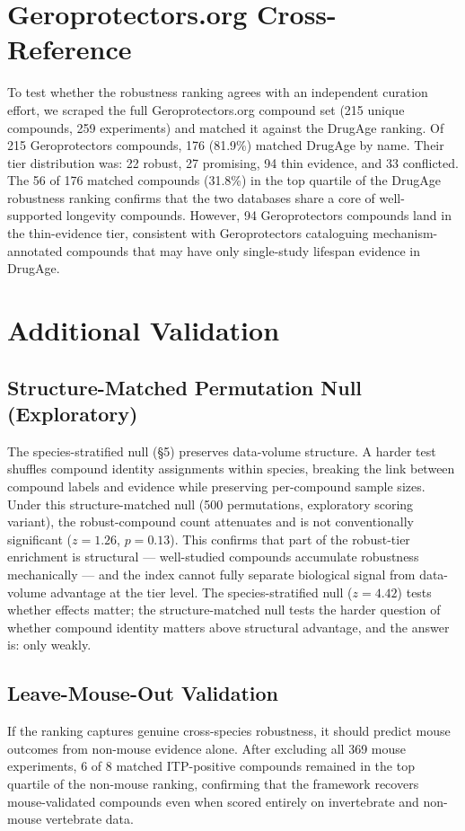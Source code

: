 \documentclass[11pt]{article}
\begin{document}
\section{Geroprotectors.org Cross-Reference}
\label{sec:gero}
To test whether the robustness ranking agrees with an independent curation effort, we scraped the full Geroprotectors.org compound set (215 unique compounds, 259 experiments) and matched it against the DrugAge ranking. Of 215 Geroprotectors compounds, 176 (81.9\%) matched DrugAge by name. Their tier distribution was: 22 robust, 27 promising, 94 thin evidence, and 33 conflicted. The 56 of 176 matched compounds (31.8\%) in the top quartile of the DrugAge robustness ranking confirms that the two databases share a core of well-supported longevity compounds. However, 94 Geroprotectors compounds land in the thin-evidence tier, consistent with Geroprotectors cataloguing mechanism-annotated compounds that may have only single-study lifespan evidence in DrugAge.

\section{Additional Validation}

\subsection{Structure-Matched Permutation Null (Exploratory)}
The species-stratified null (\S5) preserves data-volume structure. A harder test shuffles compound identity assignments within species, breaking the link between compound labels and evidence while preserving per-compound sample sizes. Under this structure-matched null (500 permutations, exploratory scoring variant), the robust-compound count attenuates and is not conventionally significant ($z = 1.26$, $p = 0.13$). This confirms that part of the robust-tier enrichment is structural --- well-studied compounds accumulate robustness mechanically --- and the index cannot fully separate biological signal from data-volume advantage at the tier level. The species-stratified null ($z = 4.42$) tests whether effects matter; the structure-matched null tests the harder question of whether compound identity matters above structural advantage, and the answer is: only weakly.

\subsection{Leave-Mouse-Out Validation}
If the ranking captures genuine cross-species robustness, it should predict mouse outcomes from non-mouse evidence alone. After excluding all 369 mouse experiments, 6 of 8 matched ITP-positive compounds remained in the top quartile of the non-mouse ranking, confirming that the framework recovers mouse-validated compounds even when scored entirely on invertebrate and non-mouse vertebrate data.
\end{document}
